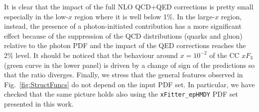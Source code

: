 
It is clear that the impact of the full NLO QCD+QED corrections is
pretty small especially in the low-$x$ region where it is well below
1\%. In the large-$x$ region, instead, the presence of a
photon-initiated contribution has a more significant effect because of
the suppression of the QCD distributions (quarks and gluon) relative
to the photon PDF and the impact of the QED corrections reaches the
2\% level. It should be noticed that the behaviour around $x=10^{-2}$
of the CC $xF_3$ (green curve in the lower panel) is driven by a
change of sign of the predictions so that the ratio diverges. Finally,
we stress that the general features observed in
Fig.~\ref{fig:StructFuncs} do not depend on the input PDF set. In
particular, we have checked that the same picture holds also using the
{\tt xFitter\_epHMDY} PDF set presented in this work.
